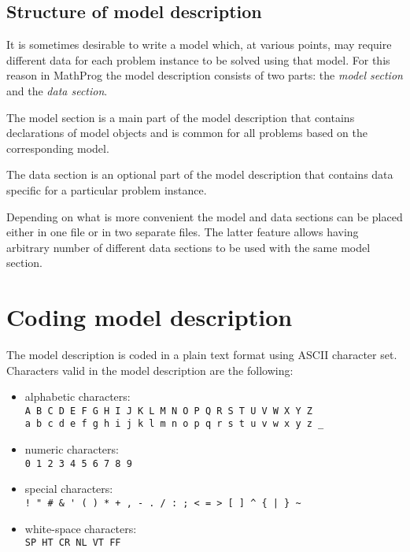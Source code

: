 \documentclass[11pt]{report}
\begin{document}
\section{Structure of model description}

It is sometimes desirable to write a model which, at various points,
may require different data for each problem instance to be solved using
that model. For this reason in MathProg the model description consists
of two parts: the {\it model section} and the {\it data section}.

The model section is a main part of the model description that contains
declarations of model objects and is common for all problems based on
the corresponding model.

The data section is an optional part of the model description that
contains data specific for a particular problem instance.

Depending on what is more convenient the model and data sections can be
placed either in one file or in two separate files. The latter feature
allows having arbitrary number of different data sections to be used
with the same model section.


\chapter{Coding model description}
\label{coding}

The model description is coded in a plain text format using ASCII
character set. Characters valid in the model description are the
following:

\begin{itemize}
\item alphabetic characters:\\
\verb|A B C D E F G H I J K L M N O P Q R S T U V W X Y Z|\\
\verb|a b c d e f g h i j k l m n o p q r s t u v w x y z _|
\item numeric characters:\\
\verb|0 1 2 3 4 5 6 7 8 9|
\item special characters:\\
\verb?! " # & ' ( ) * + , - . / : ; < = > [ ] ^ { | } ~?
\item white-space characters:\\
\verb|SP HT CR NL VT FF|
\end{itemize}
\end{document}
